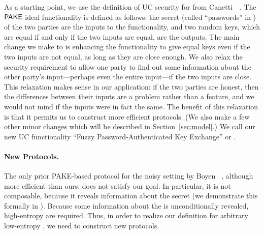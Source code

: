 As a starting point, we use the definition of UC security for \PAKE from Canetti~\etal~\cite{EC:CHKLM05}. 
The $\textsf{PAKE}$ ideal functionality is defined as follows:
the secret \passwords (called ``passwords'' in \PAKE) of the two parties are the inputs to the functionality, and two random keys, which are equal if and only if the two inputs are equal, are the outputs. 
The main change we make to \PAKE is enhancing the functionality to give equal keys even if the two inputs are not equal, as long as they are close enough. 
We also relax the security requirement to allow one party to find out some information about the other party's input---perhaps even the entire input---if the two inputs are close.
This relaxation makes sense in our application: if the two parties are honest, then the differences between their inputs are a problem rather than a feature, and we would not mind if the inputs were in fact the same. 
The benefit of this relaxation is that it permits us to construct more efficient protocols. 
(We also make a few other minor changes which will be described in Section~\ref{sec:model}.)
We call our new UC functionality ``Fuzzy Password-Authenticated Key Exchange'' or \FAKE.

\paragraph{New Protocols.}
The only prior PAKE-based protocol for the noisy setting by Boyen \etal~\cite{EC:BDKOS05}, although more efficient than ours, does not satisfy our goal.
In particular, it is not composable, because it reveals information about the secret \passwords (we demonstrate this formally in ).
Because some information about the \passwords is unconditionally revealed, high-entropy \passwords are required.
Thus, in order to realize our definition for arbitrary low-entropy \passwords, we need to construct new protocols.

